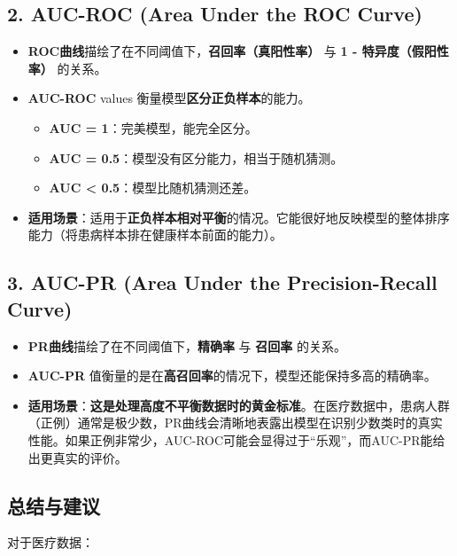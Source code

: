 \documentclass[a4paper, oneside, 12pt]{article}
\begin{document}
\begin{aireport}
{    \subsection*{2. AUC-ROC (Area Under the ROC Curve)}
    \begin{itemize}
        \item \textbf{ROC曲线}描绘了在不同阈值下，\textbf{召回率（真阳性率）} 与 \textbf{1 - 特异度（假阳性率）} 的关系。
        \item \textbf{AUC-ROC} values 衡量模型\textbf{区分正负样本}的能力。
        \begin{itemize}
            \item \textbf{AUC = 1}：完美模型，能完全区分。
            \item \textbf{AUC = 0.5}：模型没有区分能力，相当于随机猜测。
            \item \textbf{AUC < 0.5}：模型比随机猜测还差。
        \end{itemize}
        \item \textbf{适用场景}：适用于\textbf{正负样本相对平衡}的情况。它能很好地反映模型的整体排序能力（将患病样本排在健康样本前面的能力）。
    \end{itemize}

    \subsection*{3. AUC-PR (Area Under the Precision-Recall Curve)}
    \begin{itemize}
        \item \textbf{PR曲线}描绘了在不同阈值下，\textbf{精确率} 与 \textbf{召回率} 的关系。
        \item \textbf{AUC-PR} 值衡量的是在\textbf{高召回率}的情况下，模型还能保持多高的精确率。
        \item \textbf{适用场景}：\textbf{这是处理高度不平衡数据时的黄金标准}。在医疗数据中，患病人群（正例）通常是极少数，PR曲线会清晰地表露出模型在识别少数类时的真实性能。如果正例非常少，AUC-ROC可能会显得过于“乐观”，而AUC-PR能给出更真实的评价。
    \end{itemize}

    \subsection*{总结与建议}

    对于医疗数据：

}
\end{aireport}
\end{document}

